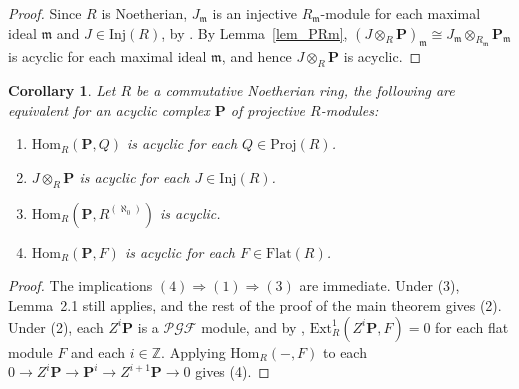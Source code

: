 \documentclass[11pt]{amsart}
\newtheorem{corollary}[theorem]{Corollary}
\theoremstyle{remark}
\begin{document}
\begin{proof}
Since $R$ is Noetherian, $J_\mathfrak m$ is an injective $R_\mathfrak m$-module for each maximal ideal $\mathfrak m$ and $J\in \mathrm{Inj}(R)$, by \cite[\S~18, Lemma~5]{Matsumura}. By Lemma~\ref{lem_PRm}, $(J \otimes_R \mathbf P)_\mathfrak m \cong J_\mathfrak m  \otimes_{R_\mathfrak m } \mathbf P_\mathfrak m$ is acyclic for each maximal ideal $\mathfrak m$, and hence $J \otimes_{R} \mathbf P$ is acyclic.
\end{proof}

\begin{corollary}
    Let $R$ be a commutative Noetherian ring, the following are equivalent for an acyclic complex $\mathbf P$ of projective $R$-modules:
    \begin{enumerate}
        \item $\mathrm{Hom}_R(\mathbf P, Q)$ is acyclic for each $Q \in \mathrm{Proj}(R)$.
        \item $J \otimes_R \mathbf P$ is acyclic for each $J \in \mathrm{Inj}(R)$.
        \item $\mathrm{Hom}_R(\mathbf P, R^{(\aleph_0)})$ is acyclic.
        \item $\mathrm{Hom}_R(\mathbf P,F)$ is acyclic for each $F \in \mathrm{Flat}(R)$.
    \end{enumerate}
\end{corollary}

\begin{proof}
The implications $(4)\Rightarrow(1)\Rightarrow(3)$ are immediate.
Under (3), Lemma~2.1 still applies, and the rest of the proof of the main theorem gives (2). 
Under (2), each $Z^i\mathbf P$ is a $\mathcal{PGF}$
module, and by \cite[Theorem~4.4]{saroch-stovicek},
$\mathrm{Ext}^1_R(Z^i\mathbf P,F)=0$ for each flat module $F$ and each $i\in\mathbb{Z}$.
Applying $\mathrm{Hom}_R(-,F)$ to each $0\to Z^i\mathbf{P} \to \mathbf{P}^i \to Z^{i+1}\mathbf{P}\to 0$ gives (4).
\end{proof}
\end{document}
